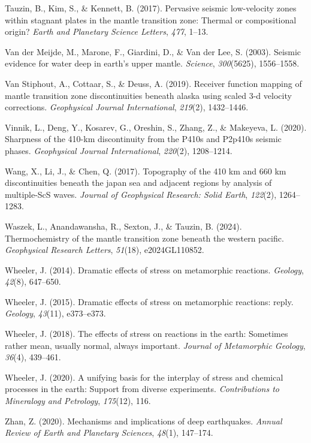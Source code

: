 \documentclass[
  paper=a4,
  ,captions=tableheading
]{scrartcl}
\newlength{\cslhangindent}
\newenvironment{CSLReferences}[2] %
  {\begin{list}{}{%
   \setlength{\itemindent}{0pt}
   \setlength{\leftmargin}{0pt}
   \setlength{\parsep}{0pt}
   \ifodd #1
    \setlength{\leftmargin}{\cslhangindent}
    \setlength{\itemindent}{-1\cslhangindent}
   \fi
   \setlength{\itemsep}{#2\baselineskip}}}
  {\end{list}}
\begin{document}
\begin{CSLReferences}{1}{0}
Tauzin, B., Kim, S., \& Kennett, B. (2017). Pervasive seismic
low-velocity zones within stagnant plates in the mantle transition zone:
Thermal or compositional origin? \emph{Earth and Planetary Science
Letters}, \emph{477}, 1--13.

Van der Meijde, M., Marone, F., Giardini, D., \& Van der Lee, S. (2003).
Seismic evidence for water deep in earth's upper mantle. \emph{Science},
\emph{300}(5625), 1556--1558.

Van Stiphout, A., Cottaar, S., \& Deuss, A. (2019). Receiver function
mapping of mantle transition zone discontinuities beneath alaska using
scaled 3-d velocity corrections. \emph{Geophysical Journal
International}, \emph{219}(2), 1432--1446.

Vinnik, L., Deng, Y., Kosarev, G., Oreshin, S., Zhang, Z., \& Makeyeva,
L. (2020). Sharpness of the 410-km discontinuity from the P410s and
P2p410s seismic phases. \emph{Geophysical Journal International},
\emph{220}(2), 1208--1214.

Wang, X., Li, J., \& Chen, Q. (2017). Topography of the 410 km and 660
km discontinuities beneath the japan sea and adjacent regions by
analysis of multiple-ScS waves. \emph{Journal of Geophysical Research:
Solid Earth}, \emph{122}(2), 1264--1283.

Waszek, L., Anandawansha, R., Sexton, J., \& Tauzin, B. (2024).
Thermochemistry of the mantle transition zone beneath the western
pacific. \emph{Geophysical Research Letters}, \emph{51}(18),
e2024GL110852.

Wheeler, J. (2014). Dramatic effects of stress on metamorphic reactions.
\emph{Geology}, \emph{42}(8), 647--650.

Wheeler, J. (2015). Dramatic effects of stress on metamorphic reactions:
reply. \emph{Geology}, \emph{43}(11), e373--e373.

Wheeler, J. (2018). The effects of stress on reactions in the earth:
Sometimes rather mean, usually normal, always important. \emph{Journal
of Metamorphic Geology}, \emph{36}(4), 439--461.

Wheeler, J. (2020). A unifying basis for the interplay of stress and
chemical processes in the earth: Support from diverse experiments.
\emph{Contributions to Mineralogy and Petrology}, \emph{175}(12), 116.

Zhan, Z. (2020). Mechanisms and implications of deep earthquakes.
\emph{Annual Review of Earth and Planetary Sciences}, \emph{48}(1),
147--174.

\end{CSLReferences}
\end{document}
